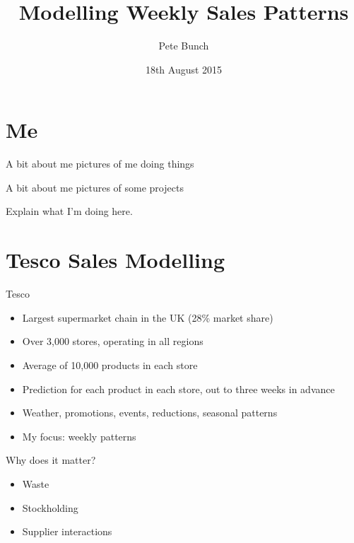 \documentclass{beamer}
\title{Modelling Weekly Sales Patterns}
\date{18th August 2015}
\author{Pete Bunch}
\institute{}
\begin{document}
\maketitle

\section{Me}

\begin{frame}{A bit about me}
 pictures of me doing things
\end{frame}

\begin{frame}{A bit about me}
 pictures of some projects
\end{frame}

\begin{frame}
 Explain what I'm doing here.
\end{frame}


\section{Tesco Sales Modelling}

\begin{frame}{Tesco}
 \begin{itemize}
  \item Largest supermarket chain in the UK (28\% market share)
  \item Over 3,000 stores, operating in all regions
  \item Average of 10,000 products in each store
  \item Prediction for each product in each store, out to three weeks in advance
  \item Weather, promotions, events, reductions, seasonal patterns
  \item My focus: weekly patterns
 \end{itemize}
\end{frame}

\begin{frame}{Why does it matter?}
 \begin{itemize}
  \item Waste
  \item Stockholding
  \item Supplier interactions
 \end{itemize}
\end{frame}
\end{document}
